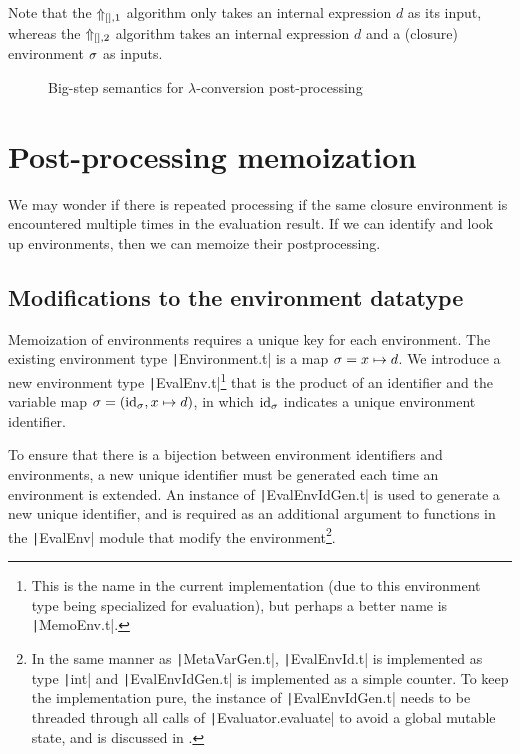 
Note that the $\Uparrow_{[],1}$ algorithm only takes an internal expression $d$ as its input, whereas the $\Uparrow_{[],2}$ algorithm takes an internal expression $d$ and a (closure) environment $\sigma$ as inputs.


\begin{figure}
  \centering
  \begin{mdframed}
    \begin{singlespace}
      
    \end{singlespace}
  \end{mdframed}
  \caption{Big-step semantics for $\lambda$-conversion post-processing}
  \label{fig:big-step-inside-formal}
\end{figure}

\section{Post-processing memoization}
\label{sec:memoization}

We may wonder if there is repeated processing if the same closure environment is encountered multiple times in the evaluation result. If we can identify and look up environments, then we can memoize their postprocessing.

\subsection{Modifications to the environment datatype}
\label{sec:memoization-evalenv}

Memoization of environments requires a unique key for each environment. The existing environment type \texttt|Environment.t| is a map $\sigma=x\mapsto d$. We introduce a new environment type \texttt|EvalEnv.t|\footnote{This is the name in the current implementation (due to this environment type being specialized for evaluation), but perhaps a better name is \texttt|MemoEnv.t|.} that is the product of an identifier and the variable map $\sigma=(\text{id}_\sigma,x\mapsto d)$, in which $\text{id}_\sigma$ indicates a unique environment identifier.

To ensure that there is a bijection between environment identifiers and environments, a new unique identifier must be generated each time an environment is extended. An instance of \texttt|EvalEnvIdGen.t| is used to generate a new unique identifier, and is required as an additional argument to functions in the \texttt|EvalEnv| module that modify the environment\footnote{
  In the same manner as \texttt|MetaVarGen.t|, \texttt|EvalEnvId.t| is implemented as type \texttt|int| and \texttt|EvalEnvIdGen.t| is implemented as a simple counter. To keep the implementation pure, the instance of \texttt|EvalEnvIdGen.t| needs to be threaded through all calls of \texttt|Evaluator.evaluate| to avoid a global mutable state, and is discussed in .
}.

